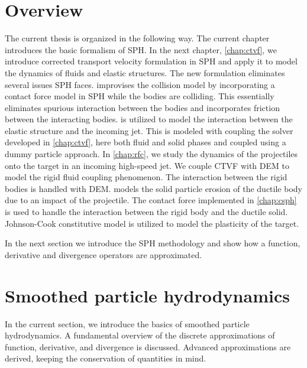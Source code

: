 \section{Overview}
The current thesis is organized in the following way. The current chapter
introduces the basic formalism of SPH. In the next chapter, \cref{chap:ctvf}, we
introduce corrected transport velocity formulation in SPH and apply it to model
the dynamics of fluids and elastic structures. The new formulation eliminates
several issues SPH faces.  improvises the collision model by
incorporating a contact force model in SPH while the bodies are colliding. This
essentially eliminates spurious interaction between the bodies and incorporates
friction between the interacting bodies.  is utilized to model
the interaction between the elastic structure and the incoming jet. This is
modeled with coupling the solver developed in \cref{chap:ctvf}, here both fluid
and solid phases and coupled using a dummy particle approach. In
\cref{chap:rfc}, we study the dynamics of the projectiles onto the target in an
incoming high-speed jet. We couple CTVF with DEM to model the rigid fluid
coupling phenomenon. The interaction between the rigid bodies is handled with
DEM.  models the solid particle erosion of the ductile body
due to an impact of the projectile. The contact force implemented in
\cref{chap:csph} is used to handle the interaction between the rigid body and
the ductile solid. Johnson-Cook constitutive model is utilized to model the
plasticity of the target.


In the next section we introduce the SPH methodology and show how a function,
derivative and divergence operators are approximated.

\section{Smoothed particle hydrodynamics}
In the current section, we introduce the basics of smoothed particle
hydrodynamics. A fundamental overview of the discrete approximations of
function, derivative, and divergence is discussed. Advanced approximations are
derived, keeping the conservation of quantities in mind.
